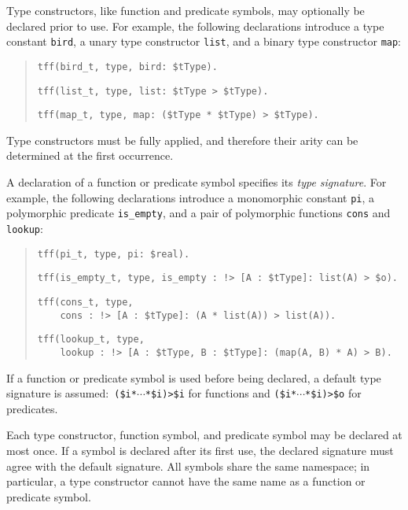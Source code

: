 Type constructors,
like function and predicate symbols,
may optionally be declared prior to use.
For example, the following declarations introduce a type
constant {\tt bird}, a unary type constructor {\tt list},
and a binary type constructor {\tt map}:
\begin{quote}
\verb+tff(bird_t, type, bird: $tType).+
\par\smallskip
\verb+tff(list_t, type, list: $tType > $tType).+
\par\smallskip
\verb+tff(map_t, type, map: ($tType * $tType) > $tType).+
\end{quote}
Type constructors must be fully applied, and therefore
their arity can be %
determined at the first occurrence.

A declaration of a function or predicate symbol specifies its {\em type
signature}. For example, the following declarations introduce a monomorphic
constant {\tt pi}, a polymorphic predicate
{\tt is\_empty}, and a pair of polymorphic functions {\tt cons} and {\tt lookup}:
\begin{quote}
\verb+tff(pi_t, type, pi: $real).+
\par\smallskip
\verb+tff(is_empty_t, type, is_empty : !> [A : $tType]: list(A) > $o).+\kern-10mm
\par\smallskip
\verb+tff(cons_t, type,+\\
\verb+    cons : !> [A : $tType]: (A * list(A)) > list(A)).+
\par\smallskip
\verb+tff(lookup_t, type,+\\
\verb+    lookup : !> [A : $tType, B : $tType]: (map(A, B) * A) > B).+
\end{quote}
If a function or predicate symbol is used before being declared, a
default type signature is assumed:\ {\tt (\$i\;*\;${\cdots}$\;*\;\$i)\;>\;\$i}
for functions and {\tt (\$i\;*\;${\cdots}$\;*\;\$i)\;>\;\$o} for predicates.

Each type constructor, function symbol, and predicate symbol may be declared at
most once. If a symbol is declared after its first use, the declared signature
must agree with the default signature. All symbols share the same namespace; in
particular, a type constructor cannot have the same name as a function or
predicate symbol.

